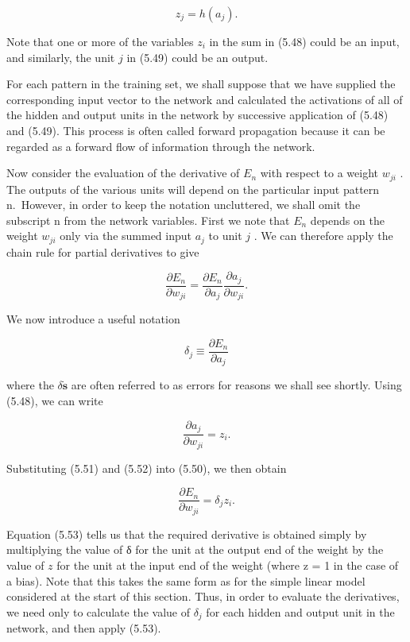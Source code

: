 \documentclass[
  10
]{article}
\begin{document}
\[
z _ {j} = h (a _ {j}).\tag{5.49}
\]

Note that one or more of the variables \(z _ { i }\) in the sum in
(5.48) could be an input, and similarly, the unit \(j\) in (5.49) could
be an output.

For each pattern in the training set, we shall suppose that we have
supplied the corresponding input vector to the network and calculated
the activations of all of the hidden and output units in the network by
successive application of (5.48) and (5.49). This process is often
called forward propagation because it can be regarded as a forward flow
of information through the network.

Now consider the evaluation of the derivative of \(E _ { n }\) with
respect to a weight \(w _ { j i }\) . The outputs of the various units
will depend on the particular input pattern n.~However, in order to keep
the notation uncluttered, we shall omit the subscript n from the network
variables. First we note that \(E _ { n }\) depends on the weight
\(w _ { j i }\) only via the summed input \(a _ { j }\) to unit \(j\) .
We can therefore apply the chain rule for partial derivatives to give

\[
\frac {\partial E _ {n}}{\partial w _ {j i}} = \frac {\partial E _ {n}}{\partial a _ {j}} \frac {\partial a _ {j}}{\partial w _ {j i}}.\tag{5.50}
\]

We now introduce a useful notation

\[
\delta_ {j} \equiv \frac {\partial E _ {n}}{\partial a _ {j}}\tag{5.51}
\]

where the \(\delta \mathbf { \dot { s } }\) are often referred to as
errors for reasons we shall see shortly. Using (5.48), we can write

\[
\frac {\partial a _ {j}}{\partial w _ {j i}} = z _ {i}.\tag{5.52}
\]

Substituting (5.51) and (5.52) into (5.50), we then obtain

\[
\frac {\partial E _ {n}}{\partial w _ {j i}} = \delta_ {j} z _ {i}.\tag{5.53}
\]

Equation (5.53) tells us that the required derivative is obtained simply
by multiplying the value of δ for the unit at the output end of the
weight by the value of \(z\) for the unit at the input end of the weight
(where z = 1 in the case of a bias). Note that this takes the same form
as for the simple linear model considered at the start of this section.
Thus, in order to evaluate the derivatives, we need only to calculate
the value of \(\delta _ { j }\) for each hidden and output unit in the
network, and then apply (5.53).
\end{document}
